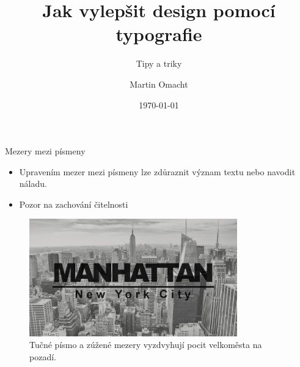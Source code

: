 \documentclass{beamer}
\title{Jak vylepšit design pomocí typografie}
\subtitle{Tipy a triky}
\date{\today}
\author{Martin Omacht}
\begin{document}
\maketitle

\begin{frame}{Mezery mezi písmeny}    
	\begin{itemize}
		\item Upravením mezer mezi písmeny lze zdůraznit význam textu nebo navodit náladu.
		\item Pozor na zachování čitelnosti
	\end{itemize}
	\begin{center}
		\begin{figure}[h]
			\includegraphics[width=90mm]{manhattan.jpg}
			\caption{Tučné písmo a zúžené mezery vyzdvyhují pocit velkoměsta na pozadí.}
		\end{figure}
	\end{center} 
\end{frame}
\end{document}
